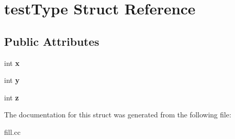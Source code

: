 \hypertarget{structtestType}{\section{test\-Type Struct Reference}
\label{structtestType}
}
\subsection*{Public Attributes}
\begin{DoxyCompactItemize}
\item 
\hypertarget{structtestType_a96c65150a03bd0e122b5498b933ed4e8}{int {\bfseries x}}\label{structtestType_a96c65150a03bd0e122b5498b933ed4e8}

\item 
\hypertarget{structtestType_ad055cf93592d4be5c7945483a7342c6e}{int {\bfseries y}}\label{structtestType_ad055cf93592d4be5c7945483a7342c6e}

\item 
\hypertarget{structtestType_a0d6cfe17c2dcf651d45598fd6d90ad3f}{int {\bfseries z}}\label{structtestType_a0d6cfe17c2dcf651d45598fd6d90ad3f}

\end{DoxyCompactItemize}


The documentation for this struct was generated from the following file\-:\begin{DoxyCompactItemize}
\item 
fill.\-cc\end{DoxyCompactItemize}
